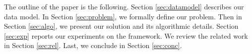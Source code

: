  

\vspace{2pt}
The outline of the paper is the following. Section \ref{sec:datamodel} describes our data model. In Section \ref{sec:problem}, we formally define our problem. Then in Section \ref{sec:algo}, we present our solution and its algorithmic details. Section  \ref{sec:exp} reports our experiments on the framework. We review the related work in Section \ref{sec:rel}. Last, we conclude in Section \ref{sec:conc}.